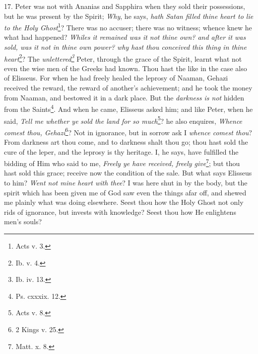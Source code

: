 17. Peter was not with Ananias and Sapphira when they sold their possessions, but he was present by the Spirit; \emph{Why}, he says, \emph{hath Satan filled thine heart to lie to the Holy Ghost}\footnote{Acts v. 3.}? There was no accuser; there was no witness; whence knew he what had happened? \emph{Whiles it remained was it not thine own? and after it was sold, was it not in thine own power? why hast thou conceived this thing in thine heart}\footnote{Ib. v. 4.}? The \emph{unlettered\footnote{Ib. iv. 13.}} Peter, through the grace of the Spirit, learnt what not even the wise men of the Greeks had known. Thou hast the like in the case also of Elisseus. For when he had freely healed the leprosy of Naaman, Gehazi received the reward, the reward of another’s achievement; and he took the money from Naaman, and bestowed it in a dark place. But the \emph{darkness is not} hidden from the Saints\footnote{Ps. cxxxix. 12.}. And when he came, Elisseus asked him; and like Peter, when he said, \emph{Tell me whether ye} \emph{sold the land for so much}\footnote{Acts v. 8.}? he also enquires, \emph{Whence comest thou, Gehazi}\footnote{2 Kings v. 25.}? Not in ignorance, but in sorrow ask I \emph{whence comest thou}? From darkness art thou come, and to darkness shalt thou go; thou hast sold the cure of the leper, and the leprosy is thy heritage. I, he says, have fulfilled the bidding of Him who said to me, \emph{Freely ye have received, freely give}\footnote{Matt. x. 8.}; but thou hast sold this grace; receive now the condition of the sale. But what says Elisseus to him? \emph{Went not mine heart with thee}? I was here shut in by the body, but the spirit which has been given me of God saw even the things afar off, and shewed me plainly what was doing elsewhere. Seest thou how the Holy Ghost not only rids of ignorance, but invests with knowledge? Seest thou how He enlightens men’s souls?

